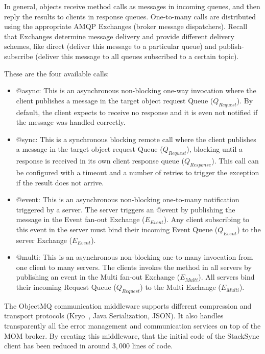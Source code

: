 In general, objects receive method calls as messages in incoming queues, and then reply the results to clients in response queues. One-to-many calls are distributed using the appropriate AMQP Exchanges (broker message dispatchers). Recall that Exchanges determine message delivery and provide different delivery schemes, like direct (deliver this message to a particular queue) and publish-subscribe (deliver this message to all queues subscribed to a certain topic). 

These are the four available calls:

\begin{itemize}

\item @async:  This is an asynchronous non-blocking  one-way invocation where the client  publishes a message in the target object request 
Queue ($Q_{Request}$). By default, the client expects to receive no response and it is even not notified if the message was handled correctly.


\item @sync:  This is a synchronous blocking remote call where the client publishes a message in the target object
request Queue ($Q_{Request}$), blocking until a response is received in its own client response queue ($Q_{Response}$).  
This call can be configured with a timeout and a number of retries to trigger the exception if the result does not arrive.

\item @event:  This is an asynchronous non-blocking one-to-many notification triggered by a server.  The server triggers an @event by publishing the message in  the Event  fan-out Exchange ($E_{Event}$). Any client subscribing to this event in the server must bind their incoming Event Queue ($Q_{Event}$) to the server Exchange ($E_{Event}$).

\item @multi: This is an asynchronous non-blocking one-to-many invocation from one client to many servers. The clients invokes the method in all servers by publishing an event in the Multi  fan-out Exchange ($E_{Multi}$). All servers bind their incoming Request Queue ($Q_{Request}$) to the Multi Exchange ($E_{Multi}$).
   
\end{itemize}

The ObjectMQ communication middleware supports different compression and transport protocols (Kryo~\cite{kryo}, Java Serialization, JSON). It also handles transparently all the error management and communication services on top of the MOM broker. By creating this middleware, that the initial code of the StackSync client has been reduced in around $3,000$ lines of code.


